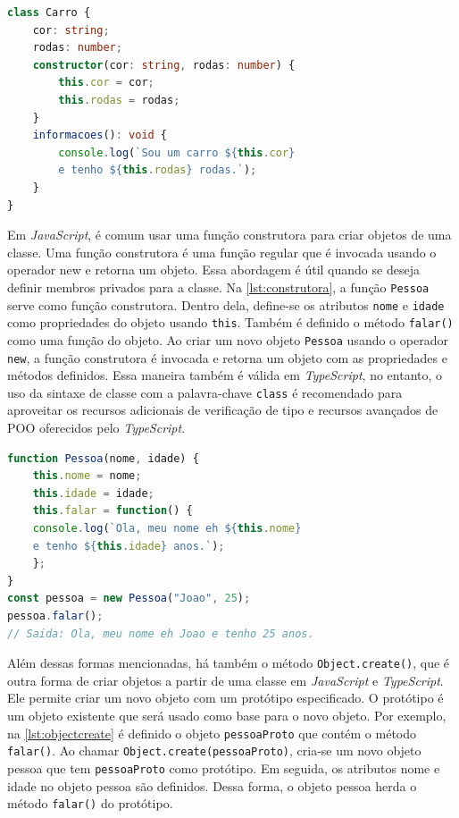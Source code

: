 \begin{lstlisting}[language=TypeScript, caption=Adicionando inicializador de objetos em TS., label=lst:constructor-ts]
class Carro {
    cor: string;
    rodas: number;
    constructor(cor: string, rodas: number) {
        this.cor = cor;
        this.rodas = rodas;
    }
    informacoes(): void {
        console.log(`Sou um carro ${this.cor} 
        e tenho ${this.rodas} rodas.`);
    }
}
\end{lstlisting}


Em \textit{JavaScript}, é comum usar uma função construtora para criar objetos de uma classe. Uma função construtora é uma função regular que é invocada usando o operador new e retorna um objeto. Essa abordagem é útil quando se deseja definir membros privados para a classe. Na \autoref{lst:construtora}, a função \texttt{Pessoa} serve como função construtora. Dentro dela, define-se os atributos \texttt{nome} e \texttt{idade} como propriedades do objeto usando \texttt{this}. Também é definido o método \texttt{falar()} como uma função do objeto. Ao criar um novo objeto \texttt{Pessoa} usando o operador \texttt{new}, a função construtora é invocada e retorna um objeto com as propriedades e métodos definidos. Essa maneira também é válida em \textit{TypeScript}, no entanto, o uso da sintaxe de classe com a palavra-chave \texttt{class} é recomendado para aproveitar os recursos adicionais de verificação de tipo e recursos avançados de POO oferecidos pelo \textit{TypeScript}.



\begin{lstlisting}[language=TypeScript, caption=Exemplo de função construtora em JS., label=lst:construtora]
function Pessoa(nome, idade) {
    this.nome = nome;
    this.idade = idade;
    this.falar = function() {
    console.log(`Ola, meu nome eh ${this.nome} 
    e tenho ${this.idade} anos.`);
    };
}
const pessoa = new Pessoa("Joao", 25);
pessoa.falar(); 
// Saida: Ola, meu nome eh Joao e tenho 25 anos.
\end{lstlisting}

Além dessas formas mencionadas, há também o método \texttt{Object.create()}, que é outra forma de criar objetos a partir de uma classe em \textit{JavaScript} e \textit{TypeScript}. Ele permite criar um novo objeto com um protótipo especificado. O protótipo é um objeto existente que será usado como base para o novo objeto. Por exemplo, na \autoref{lst:objectcreate} é definido o objeto \texttt{pessoaProto} que contém o método \texttt{falar()}. Ao chamar \texttt{Object.create(pessoaProto)}, cria-se um novo objeto pessoa que tem \texttt{pessoaProto} como protótipo. Em seguida, os atributos nome e idade no objeto pessoa são definidos. Dessa forma, o objeto pessoa herda o método \texttt{falar()} do protótipo.



